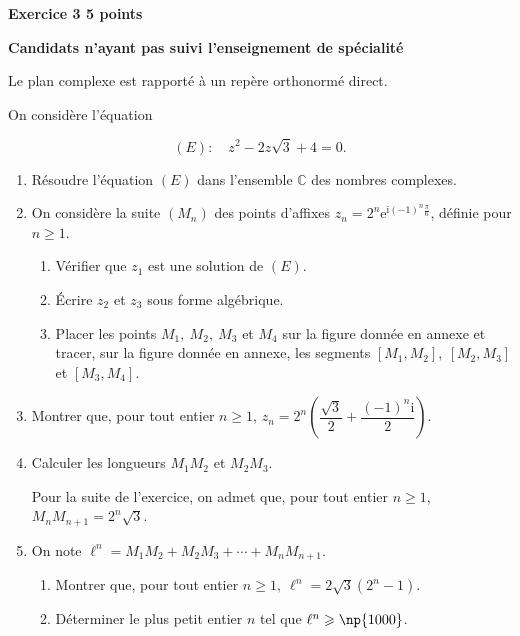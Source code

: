 \documentclass[10pt]{article}
\newcommand{\C}{\mathbb{C}}
\begin{document}
\vspace{0,5cm}

\textbf{Exercice 3 \hfill 5 points}

\textbf{Candidats n'ayant pas suivi l'enseignement de spécialité}

\medskip
 
Le plan complexe est rapporté à un repère orthonormé direct.
 
On considère l'équation  

\[(E) :\quad  z^2 - 2z\sqrt{3} + 4 = 0.\]
 
\begin{enumerate}
\item Résoudre l'équation $(E)$ dans l'ensemble $\C$ des nombres complexes. 
\item On considère la suite $\left(M_{n}\right)$ des points d'affixes $z_{n} = 2^n \text{e}^{\text{i}(- 1)^n\frac{\pi}{6}}$, définie pour $n \geqslant 1$. 
	\begin{enumerate}
		\item Vérifier que $z_{1}$ est une solution de $(E)$. 
		\item Écrire $z_{2}$ et $z_{3}$ sous forme algébrique. 
		\item Placer les points $M_{1},\: M_{2},\: M_{3}$ et $M_{4}$ sur la figure donnée en annexe et tracer, sur la figure donnée en annexe, les segments $\left[M_{1}, M_{2}\right],\: \left[M_{2}, M_{3}\right]$ et $\left[M_{3}, M_{4}\right]$.
	\end{enumerate} 
\item Montrer que, pour tout entier $n \geqslant 1$,\: $z_{n} = 2^n \left(\dfrac{\sqrt{3}}{2} + \dfrac{(- 1)^n \text{i}}{2}\right)$. 
\item Calculer les longueurs $M_{1}M_{2}$ et $M_{2}M_{3}$.

\medskip

Pour la suite de l'exercice, on admet que, pour tout entier $n \geqslant 1$,\: $M_{n}M_{n+1} = 2^n \sqrt{3}$. 
\item On note $\ell^n = M_{1}M_{2} + M_{2}M_{3} + \cdots 	+ M_{n}M_{n+1}$.
	\begin{enumerate}
		\item Montrer que, pour tout entier $n \geqslant 1,\: \ell^n = 2\sqrt{3}\left(2^n - 1\right)$. 
		\item Déterminer le plus petit entier $n$ tel que $\ell^n \geqslant  \np{1000}$.
	\end{enumerate} 
\end{enumerate}
\end{document}
